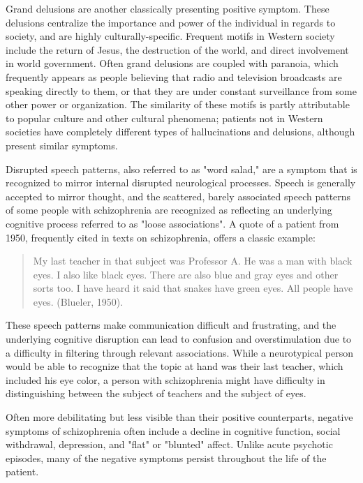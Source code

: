 \documentclass[12pt,twoside]{reedthesis}
\begin{document}
	Grand delusions are another classically presenting positive symptom. These delusions centralize the importance and power of the individual in regards to society, and are highly culturally-specific. Frequent motifs in Western society include the return of Jesus, the destruction of the world,  and direct involvement in world government. Often grand delusions are coupled with paranoia, which frequently appears as people believing that radio and television broadcasts are speaking directly to them, or that they are under constant surveillance from some other power or organization. The similarity of these motifs is partly attributable to popular culture and other cultural phenomena; patients not in Western societies have completely different types of hallucinations and delusions, although present similar symptoms. 
	
	Disrupted speech patterns, also referred to as "word salad," are a symptom that is recognized to mirror internal disrupted neurological processes. Speech is generally accepted to mirror thought, and the scattered, barely associated speech patterns of some people with schizophrenia are recognized as reflecting an underlying cognitive process referred to as "loose associations". A quote of a patient from 1950, frequently cited in texts on schizophrenia, offers a classic example: \begin{quote}My last teacher in that subject was Professor A. He was a man with black eyes. I also like black eyes. There are also blue and gray eyes and other sorts too. I have heard it said that snakes have green eyes. All people have eyes. (Blueler, 1950).\end{quote}
	
	 These speech patterns make communication difficult and frustrating, and the underlying cognitive disruption can lead to confusion and overstimulation due to a difficulty in filtering through relevant associations. While a neurotypical person would be able to recognize that the topic at hand was their last teacher, which included his eye color, a person with schizophrenia might have difficulty in distinguishing between the subject of teachers and the subject of eyes. 
	 
	 Often more debilitating but less visible than their positive counterparts, negative symptoms of schizophrenia often include a decline in cognitive function, social withdrawal, depression, and "flat" or "blunted" affect. Unlike acute psychotic episodes, many of the negative symptoms persist throughout the life of the patient. 
	
\end{document}
